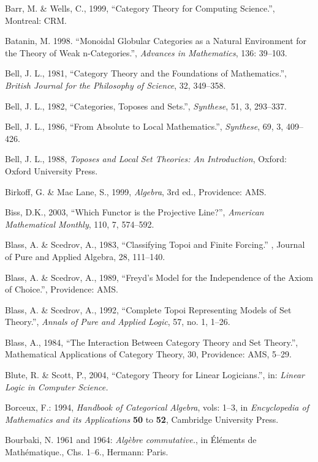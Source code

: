 \documentclass[12pt]{article}
\theoremstyle{plain}
\theoremstyle{definition}
\numberwithin{equation}{section}
\begin{document}
\begin{thebibliography}{99}
Barr, M. \& Wells, C., 1999, ``Category Theory for Computing Science.'', Montreal: CRM. 
 
Batanin, M. 1998. ``Monoidal Globular Categories as a Natural Environment for the Theory of Weak n-Categories.'', 
\emph{Advances in Mathematics}, 136: 39--103.   

Bell, J. L., 1981, ``Category Theory and the Foundations of Mathematics.'', 
\emph{British Journal for the Philosophy of Science}, 32, 349--358. 
 
Bell, J. L., 1982, ``Categories, Toposes and Sets.'', \emph{Synthese}, 51, 3, 293--337. 
 
Bell, J. L., 1986, ``From Absolute to Local Mathematics.'', \emph{Synthese}, 69, 3, 409--426. 

Bell, J. L., 1988, {\em Toposes and Local Set Theories: An Introduction}, Oxford: Oxford University Press. 

Birkoff, G. \& Mac Lane, S., 1999, {\em Algebra}, 3rd ed., Providence: AMS.  

Biss, D.K., 2003, ``Which Functor is the Projective Line?'', \emph{American Mathematical Monthly}, 110, 7, 574--592. 

Blass, A. \& Scedrov, A., 1983, ``Classifying Topoi and Finite Forcing.'' , Journal of Pure and Applied Algebra, 28, 111--140. 

Blass, A. \& Scedrov, A., 1989, ``Freyd's Model for the Independence of the Axiom of Choice.'', Providence: AMS.  

Blass, A. \& Scedrov, A., 1992, ``Complete Topoi Representing Models of Set Theory.'', 
\emph{Annals of Pure and Applied Logic}, 57, no. 1, 1--26.  

Blass, A., 1984, ``The Interaction Between Category Theory and Set Theory.'', Mathematical Applications of Category Theory, 30, Providence: AMS, 5--29. 

Blute, R. \& Scott, P., 2004, ``Category Theory for Linear Logicians.'', 
in: {\em Linear Logic in Computer Science.}

Borceux, F.: 1994, \emph{Handbook of Categorical Algebra}, vols: 1--3, 
in {\em Encyclopedia of Mathematics and its Applications} \textbf{50} to \textbf{52}, Cambridge University Press.

Bourbaki, N. 1961 and 1964: \emph{Alg\`{e}bre commutative.},
in \'{E}l\'{e}ments de Math\'{e}matique., Chs. 1--6., Hermann: Paris.


\end{thebibliography}
\end{document}
